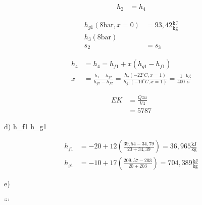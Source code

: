 
\begin{align*}
h_2 & = h_4
\end{align*}


\begin{align*}
h_{g1} (8 \text{bar}, x = 0) & = 93,42 \frac{\text{kJ}}{\text{kg}} \\
h_3 (8 \text{bar}) & \\
s_2 & = s_3
\end{align*}

\begin{align*}
h_4 & = h_4 = h_{f1} + x (h_{g1} - h_{f1}) \\
x & = \frac{h_1 - h_{f2}}{h_{g2} - h_{f2}} = \frac{h_2 (-22^\circ C, x = 1)}{h_{g1} (-10^\circ C, x = 1)} = \frac{1}{400} \frac{\text{kg}}{\text{s}}
\end{align*}

\begin{align*}
EK & = \frac{Qzu}{V4} \\
& = 5787
\end{align*}

d)  h_{f1}  h_{g1}

\begin{align*}
h_{f1} & = -20 + 12 \left( \frac{39,54 - 34,79}{20 + 34,39} \right) = 36,965 \frac{\text{kJ}}{\text{kg}} \\
h_{g1} & = -10 + 17 \left( \frac{209,57 - 203}{20 + 203} \right) = 704,389 \frac{\text{kJ}}{\text{kg}}
\end{align*}

e) 

```